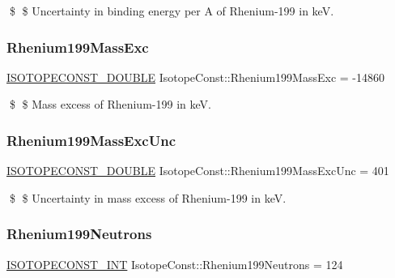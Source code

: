 \$ \$ Uncertainty in binding energy per A of Rhenium-\/199 in keV. \mbox{\label{group___isotope_const-_rhenium-_re199_ga520b9fd62b003c9832c00215850d2d0b}} 
\subsubsection{\texorpdfstring{Rhenium199\+Mass\+Exc}{Rhenium199MassExc}}
{\footnotesize\ttfamily \mbox{\hyperlink{group___isotope_const-_macros_ga8f45a7272ce02c0b4c65c44636ed719a}{I\+S\+O\+T\+O\+P\+E\+C\+O\+N\+S\+T\+\_\+\+D\+O\+U\+B\+LE}} Isotope\+Const\+::\+Rhenium199\+Mass\+Exc = -\/14860}

\$ \$ Mass excess of Rhenium-\/199 in keV. \mbox{\label{group___isotope_const-_rhenium-_re199_ga8f06d92fcb262742fb96182c7e42f4b8}} 
\subsubsection{\texorpdfstring{Rhenium199\+Mass\+Exc\+Unc}{Rhenium199MassExcUnc}}
{\footnotesize\ttfamily \mbox{\hyperlink{group___isotope_const-_macros_ga8f45a7272ce02c0b4c65c44636ed719a}{I\+S\+O\+T\+O\+P\+E\+C\+O\+N\+S\+T\+\_\+\+D\+O\+U\+B\+LE}} Isotope\+Const\+::\+Rhenium199\+Mass\+Exc\+Unc = 401}

\$ \$ Uncertainty in mass excess of Rhenium-\/199 in keV. \mbox{\label{group___isotope_const-_rhenium-_re199_ga87d3d3ea51a0b1069cb4934f1815cf52}} 
\subsubsection{\texorpdfstring{Rhenium199\+Neutrons}{Rhenium199Neutrons}}
{\footnotesize\ttfamily \mbox{\hyperlink{group___isotope_const-_macros_ga5f18360b3e99483a35c32d789e62621c}{I\+S\+O\+T\+O\+P\+E\+C\+O\+N\+S\+T\+\_\+\+I\+NT}} Isotope\+Const\+::\+Rhenium199\+Neutrons = 124}

